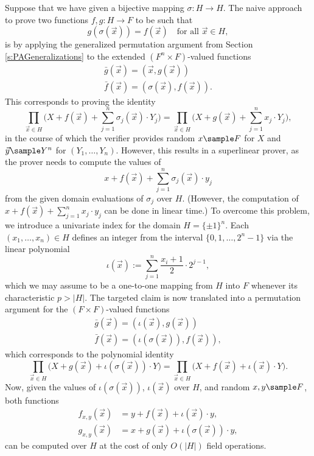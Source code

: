 \documentclass[11pt]{article}
\theoremstyle{definition}
\theoremstyle{remark}
\begin{document}
Suppose that we have given a bijective mapping $\sigma: H\rightarrow H$. 
The naive approach to prove two functions $f,g: H\longrightarrow F$ to be such that 
\[
g(\sigma(\vec x)) = f(\vec x) \quad\text{for all $\vec x\in H$},
\]
is by applying the generalized permutation argument from Section \ref{s:PAGeneralizations} to the extended $(F^n\times F)$-valued functions
\begin{align*}
\bar g(\vec x) = (\vec x, g(\vec x))
\\
\bar f(\vec x) = (\sigma(\vec x), f(\vec x)).
\end{align*}
This corresponds to proving the identity
\begin{equation}
\prod_{\vec x\in H} \Big(X + f(\vec x) + \sum_{j=1}^n \sigma_{j}(\vec x)\cdot Y_j\Big) = \prod_{\vec x\in H}  \Big(X + g(\vec x) +  \sum_{j=1}^n x_j \cdot Y_j\Big),
\end{equation}
in the course of which the verifier provides random $x\sample F$ for $X$ and $\vec y\sample Y^n$ for $(Y_1,\ldots, Y_n)$.
However, this results in a superlinear prover, as the prover needs to compute the values of
\[
x + f(\vec x) +  \sum_{j=1}^n \sigma_{j}(\vec x)\cdot y_j
\]
from the given domain evaluations of $\sigma_j$ over $H$.
(However, the computation of $x + f(\vec x) +  \sum_{j=1}^n x_j \cdot y_j$ can be done in linear time.)
To overcome this problem, we introduce a univariate index for the domain $H=\{\pm 1\}^n$. 
Each $(x_1,\ldots, x_n)\in H $ defines an integer from the interval $\{0,1, \ldots, 2^n -1\}$ via the linear polynomial
\begin{equation*}
\iota(\vec x) := \sum_{j=1}^n \frac{x_i + 1}{2} \cdot 2^{j-1},
\end{equation*}
which we may assume to be a one-to-one mapping from $H$ into $F$ whenever its characteristic $p > |H|$.
The targeted claim is now translated into a permutation argument for the $(F\times F)$-valued functions
\begin{align*}
\bar g(\vec x) = (\iota(\vec x), g(\vec x))
\\
\bar f(\vec x) = (\iota(\sigma(\vec x)), f(\vec x)),
\end{align*}
which corresponds to the polynomial identity
\begin{equation*}
\prod_{\vec x\in H} \Big(X + g(\vec x) +\iota(\sigma(\vec x))\cdot Y\Big) = \prod_{\vec x\in H}  \Big(X + f(\vec x) + \iota(\vec x) \cdot Y \Big).
\end{equation*}
Now, given the values of $\iota(\sigma(\vec x))$, $\iota(\vec x)$ over $H$,  and random $x, y\sample F$, both functions 
\begin{align*}
f_{x,y}(\vec x) &= y + f(\vec x) + \iota(\vec x) \cdot y,
\\
g_{x,y}(\vec x) &= x + g(\vec x) +\iota(\sigma(\vec x))\cdot y,
\end{align*}
can be computed over $H$ at the cost of only $O(|H|)$ field operations.
\end{document}
